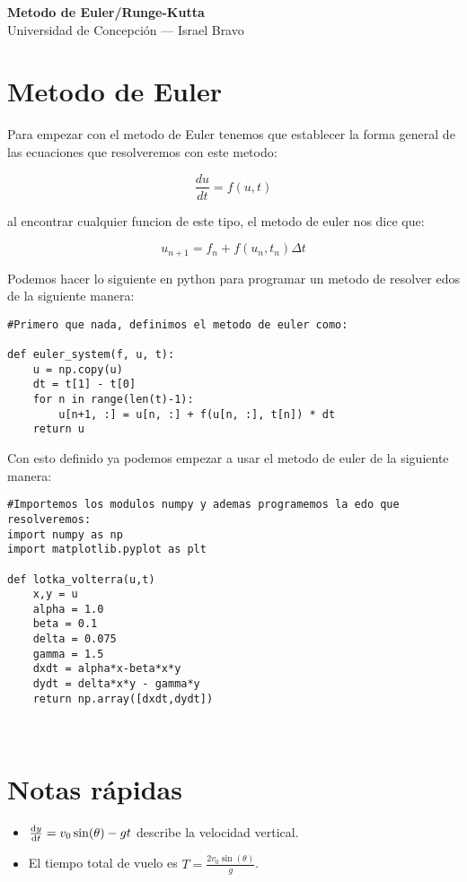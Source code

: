\documentclass[11pt,a4paper]{article}
\begin{document}
\begin{center}
    {\LARGE \textbf{Metodo de Euler/Runge-Kutta}}\\[4pt]
    {\large Universidad de Concepción — Israel Bravo}\\[10pt]
    \hrulefill
\end{center}

\section*{Metodo de Euler}
Para empezar con el metodo de Euler tenemos que establecer la forma general de las ecuaciones que resolveremos con este metodo:

\begin{equation}
	\frac{du}{dt} = f(u,t)
\end{equation}

al encontrar cualquier funcion de este tipo, el metodo de euler nos dice que:

\begin{equation}
	u_{n+1}=f_n+f(u_n,t_n) \Delta t
\end{equation}

Podemos hacer lo siguiente en python para programar un metodo de resolver edos de la siguiente manera:

\begin{lstlisting}[caption={Programar el metodo de Euler}]
#Primero que nada, definimos el metodo de euler como:

def euler_system(f, u, t):
    u = np.copy(u)
    dt = t[1] - t[0]
    for n in range(len(t)-1):
        u[n+1, :] = u[n, :] + f(u[n, :], t[n]) * dt
    return u

\end{lstlisting}
Con esto definido ya podemos empezar a usar el metodo de euler de la siguiente manera:

\begin{lstlisting}[caption={Definamos la funcion y todos los parametros}]
#Importemos los modulos numpy y ademas programemos la edo que resolveremos:
import numpy as np
import matplotlib.pyplot as plt

def lotka_volterra(u,t)
	x,y = u
	alpha = 1.0
	beta = 0.1
	delta = 0.075
	gamma = 1.5
	dxdt = alpha*x-beta*x*y
	dydt = delta*x*y - gamma*y
	return np.array([dxdt,dydt])



\end{lstlisting}

\section*{Notas rápidas}
\begin{itemize}
    \item $\dv{y}{t} = v_0 \sin(\theta) - g t$ describe la velocidad vertical.
    \item El tiempo total de vuelo es $T = \frac{2v_0\sin(\theta)}{g}$.
\end{itemize}
\end{document}
